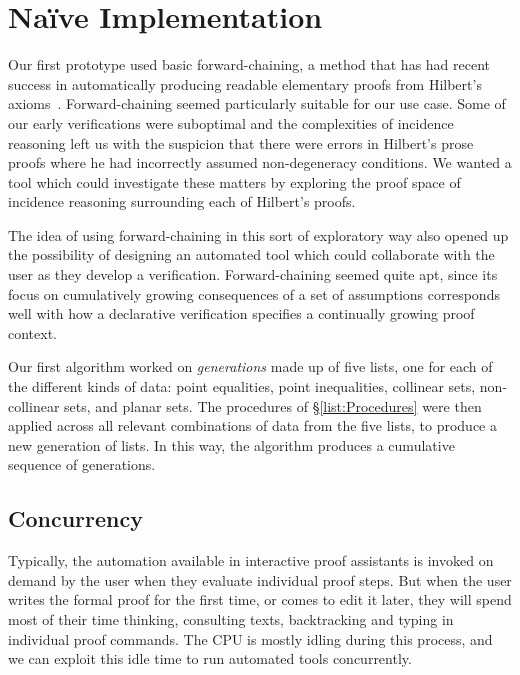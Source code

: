
\section{Na\"{i}ve Implementation}\label{sec:NaiveImplementation}
Our first prototype used basic forward-chaining, a method that has had recent success in automatically producing readable elementary proofs from Hilbert's axioms~\cite{ForwardChainHilbert}. Forward-chaining seemed particularly suitable for our use case. Some of our early verifications were suboptimal and the complexities of incidence reasoning left us with the suspicion that there were errors in Hilbert's prose proofs where he had incorrectly assumed non-degeneracy conditions. We wanted a tool which could investigate these matters by exploring the proof space of incidence reasoning surrounding each of Hilbert's proofs. 

The idea of using forward-chaining in this sort of exploratory way also opened up the possibility of designing an automated tool which could collaborate with the user as they develop a verification. Forward-chaining seemed quite apt, since its focus on cumulatively growing consequences of a set of assumptions corresponds well with how a declarative verification specifies a continually growing proof context. 

Our first algorithm worked on \emph{generations} made up of five lists, one for each of the different kinds of data: point equalities, point inequalities, collinear sets, non-collinear sets, and planar sets. The procedures of \S\ref{list:Procedures} were then applied across all relevant combinations of data from the five lists, to produce a new generation of lists. In this way, the algorithm produces a cumulative sequence of generations.

\subsection{Concurrency}\label{sec:NaiveConcurrency}
Typically, the automation available in interactive proof assistants is invoked on demand by the user when they evaluate individual proof steps. But when the user writes the formal proof for the first time, or comes to edit it later, they will spend most of their time thinking, consulting texts, backtracking and typing in individual proof commands. The CPU is mostly idling during this process, and we can exploit this idle time to run automated tools concurrently.

